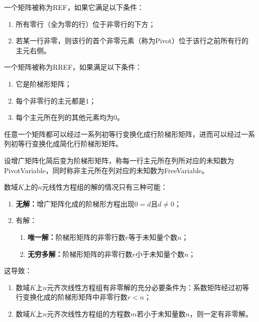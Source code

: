 \begin{definition}
	一个矩阵被称为\gls{REF}，如果它满足以下条件：
	\begin{enumerate}
		\item 所有零行（全为零的行）位于非零行的下方；
		\item 若某一行非零，则该行的首个非零元素（称为\gls{Pivot}）位于该行之前所有行的主元右侧。
	\end{enumerate}
	一个矩阵被称为\gls{RREF}，如果满足以下条件：
	\begin{enumerate}
		\item 它是阶梯形矩阵；
		\item 每个非零行的主元都是$1$；
		\item 每个主元所在列的其他元素均为$0$。
	\end{enumerate}
\end{definition}
\begin{theorem}
	任意一个矩阵都可以经过一系列初等行变换化成行阶梯形矩阵，进而可以经过一系列初等行变换化成简化行阶梯形矩阵。
\end{theorem}
\begin{definition}
	设增广矩阵化简后变为阶梯形矩阵，称每一行主元所在列所对应的未知数为\gls{PivotVariable}，同时称非主元所在列对应的未知数为\gls{FreeVariable}。
\end{definition}
\begin{theorem}\label{theo:SolutionOfSLE1}	
	数域$K$上的$n$元线性方程组的解的情况只有三种可能：
	\begin{enumerate}
		\item \textbf{无解：}增广矩阵化成的阶梯形方程出现$0=d$且$d\ne0$；
		\item 有解：
		\begin{enumerate}
			\item \textbf{唯一解：}阶梯形矩阵的非零行数$r$等于未知量个数$n$；
			\item \textbf{无穷多解：}阶梯形矩阵的非零行数$r$小于未知量个数$n$；
		\end{enumerate}
	\end{enumerate}
	这导致：
	\begin{enumerate}
		\item 数域$K$上$n$元齐次线性方程组有非零解的充分必要条件为：系数矩阵经过初等行变换化成的阶梯形矩阵中非零行数$r<n$；
		\item 数域$K$上$n$元齐次线性方程组的方程数$m$若小于未知量数$n$，则一定有非零解。
	\end{enumerate}
\end{theorem}
